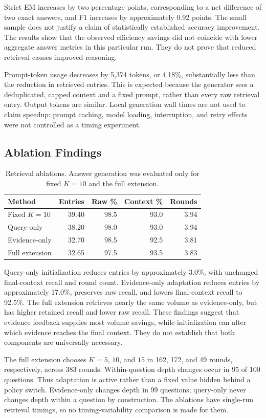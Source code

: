 \documentclass[conference]{IEEEtran}
\begin{document}
Strict EM increases by two percentage points, corresponding to a net difference of two exact answers, and F1 increases by approximately 0.92 points. The small sample does not justify a claim of statistically established accuracy improvement. The results show that the observed efficiency savings did not coincide with lower aggregate answer metrics in this particular run. They do not prove that reduced retrieval causes improved reasoning.

Prompt-token usage decreases by 5,374 tokens, or 4.18\%, substantially less than the reduction in retrieved entries. This is expected because the generator sees a deduplicated, capped context and a fixed prompt, rather than every raw retrieval entry. Output tokens are similar. Local generation wall times are not used to claim speedup: prompt caching, model loading, interruption, and retry effects were not controlled as a timing experiment.

\subsection{Ablation Findings}
\begin{table}[t]\caption{Retrieval ablations. Answer generation was evaluated only for fixed $K=10$ and the full extension.}\label{tab:ablation}\centering\small
\begin{tabular}{lrrrr}\toprule
Method & Entries & Raw \% & Context \% & Rounds\\\midrule
Fixed $K=10$&39.40&98.5&93.0&3.94\\
Query-only&38.20&98.0&93.0&3.94\\
Evidence-only&32.70&98.5&92.5&3.81\\
Full extension&32.65&97.5&93.5&3.83\\\bottomrule
\end{tabular}\end{table}
Query-only initialization reduces entries by approximately 3.0\%, with unchanged final-context recall and round count. Evidence-only adaptation reduces entries by approximately 17.0\%, preserves raw recall, and lowers final-context recall to 92.5\%. The full extension retrieves nearly the same volume as evidence-only, but has higher retained recall and lower raw recall. These findings suggest that evidence feedback supplies most volume savings, while initialization can alter which evidence reaches the final context. They do not establish that both components are universally necessary.

The full extension chooses $K=5$, $10$, and $15$ in 162, 172, and 49 rounds, respectively, across 383 rounds. Within-question depth changes occur in 95 of 100 questions. Thus adaptation is active rather than a fixed value hidden behind a policy switch. Evidence-only changes depth in 99 questions; query-only never changes depth within a question by construction. The ablations have single-run retrieval timings, so no timing-variability comparison is made for them.
\end{document}
